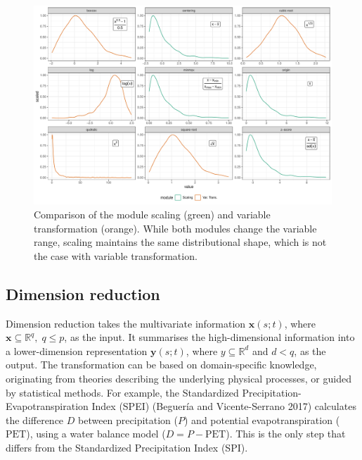 \documentclass[
]{interact}
\begin{document}
\begin{figure}

{\centering \includegraphics{tidyindex_files/figure-pdf/fig-scale-var-trans-compare-1.pdf}

}

\caption{\label{fig-scale-var-trans-compare}Comparison of the module
scaling (green) and variable transformation (orange). While both modules
change the variable range, scaling maintains the same distributional
shape, which is not the case with variable transformation.}

\end{figure}

\hypertarget{dimension-reduction}{%
\subsection{Dimension reduction}\label{dimension-reduction}}

Dimension reduction takes the multivariate information
\(\mathbf{x}(s;t)\), where
\(\mathbf{x} \subseteq \mathbb{R}^q,\; q\leq p\), as the input. It
summarises the high-dimensional information into a lower-dimension
representation \(\mathbf{y}(s;t)\), where \(y \subseteq \mathbb{R}^d\)
and \(d < q\), as the output. The transformation can be based on
domain-specific knowledge, originating from theories describing the
underlying physical processes, or guided by statistical methods. For
example, the Standardized Precipitation-Evapotranspiration Index (SPEI)
(Beguería and Vicente-Serrano 2017) calculates the difference \(D\)
between precipitation (\(P\)) and potential evapotranspiration
(\(\text{PET}\)), using a water balance model (\(D = P - \text{PET}\)).
This is the only step that differs from the Standardized Precipitation
Index (SPI).
\end{document}
